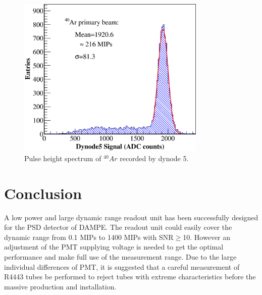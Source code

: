 \documentclass[5p, times]{elsarticle}
\begin{document}
\begin{figure}
 \centering
 \includegraphics[width=90mm]{Ar}
\caption{Pulse height spectrum of $^{40}Ar$ recorded by dynode 5.}
\label{fig:Ar}
\end{figure} 

\section{Conclusion}
\label{sec:conclusion}
A low power and large dynamic range readout unit has been successfully designed for the PSD detector of DAMPE.
The readout unit could easily cover the dynamic range from 0.1 MIPs to 1400 MIPs with SNR$\geq$10.
However an adjustment of the PMT supplying voltage is needed to get the optimal performance and make full use of the measurement range.
Due to the large individual differences of PMT, it is suggested that a careful measurement of R4443 tubes be performed to reject tubes with extreme characteristics before the massive production and installation.

\end{document}
